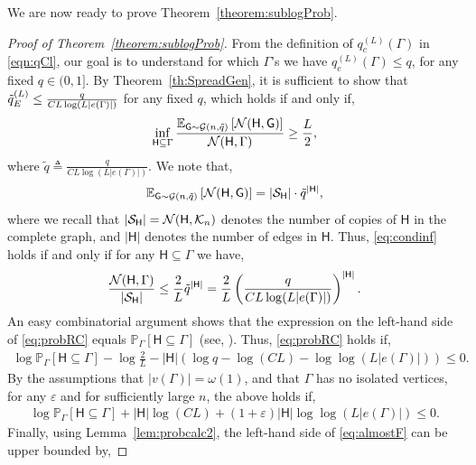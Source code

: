 \documentclass[12pt]{article}
\newcommand{\E}{\mathbb{E}}
\def\P{{\mathbb P}}
\newcommand{\calG}{{\cal G}}
\newcommand{\calK}{{\cal K}}
\newcommand{\calN}{{\cal N}}
\newcommand{\calS}{{\cal S}}
\newcommand{\p}[1]{\left(#1\right)}
\newcommand{\pp}[1]{\left[#1\right]}
\newcommand{\s}[1]{\mathsf{#1}}
\begin{document}
We are now ready to prove Theorem~\ref{theorem:sublogProb}.
\begin{proof}[Proof of Theorem~\ref{theorem:sublogProb}]
    From the definition of $q_{c}^{(L)}(\Gamma)$ in \eqref{eqn:qCl}, our goal is to understand for which $\Gamma$'s we have $q_{c}^{(L)}(\Gamma)\leq q$, for any fixed $q\in (0,1]$. By Theorem~\ref{th:SpreadGen}, it is sufficient to show that $ \Tilde{q}_E^{(L)}\leq \frac{q}{CL\log(L|e(\Gamma)|)}$ for any fixed $q$, which holds if and only if,
    \begin{align}
        \inf_{\s{H}\subseteq \Gamma} \frac{\E_{\s{G}\sim\calG(n,\tilde{q})}\pp{\calN(\s{H},\s{G})}}{\calN(\s{H},\Gamma)}\geq \frac{L}{2},\label{eq:condinf}
    \end{align}
    where $\tilde{q}\triangleq\frac{q}{CL\log(L|e(\Gamma)|)}$. We note that,
    \begin{align}
    {\E_{\s{G}\sim\calG(n,\tilde{q})}\pp{\calN(\s{H},\s{G})}}=|\calS_{\s{H}}|\cdot \tilde{q}^{|\s{H}|},
    \end{align}
    where we recall that $|\calS_{\s{H}}|=\calN(\s{H},\calK_n)$ denotes the number of copies of $\s{H}$ in the complete graph, and $|\s{H}|$ denotes the number of edges in $\s{H}$. Thus, \eqref{eq:condinf} holds if and only if for any $\s{H}\subseteq \Gamma$ we have,
    \begin{align}
        \frac{\calN(\s{H},\Gamma)}{|\calS_{\s{H}}|}\leq \frac{2}{L} \tilde{q}^{|\s{H}|}=\frac{2}{L}\p{\frac{q}{CL\log(L|e(\Gamma)|)}}^{|\s{H}|}.\label{eq:probRC}
    \end{align}
    An easy combinatorial argument shows that the expression on the left-hand side of \eqref{eq:probRC} equals $\P_{\Gamma}[\s{H}\subseteq \Gamma]$ (see, \cite[Lemma~2]{elimelech2025detecting}). Thus, \eqref{eq:probRC} holds if,
    \begin{align}
        \log \P_{\Gamma}[\s{H}\subseteq \Gamma]-\log\frac{2}{L}-|\s{H}|\p{\log q -\log(CL)-\log\log(L|e(\Gamma)|)}\leq 0.
    \end{align}
    By the assumptions that $|v(\Gamma)|=\omega(1)$, and that $\Gamma$ has no isolated vertices, for any $\varepsilon$ and for sufficiently large $n$, the above holds if, 
    \begin{align}
        \log \P_{\Gamma}[\s{H}\subseteq \Gamma]+|\s{H}|\log(CL)+(1+\varepsilon)|\s{H}|\log\log(L|e(\Gamma)|)\leq 0.\label{eq:almostF}
    \end{align}
    Finally, using Lemma~\ref{lem:probcalc2}, the left-hand side of \eqref{eq:almostF} can be upper bounded by,

\end{proof}
\end{document}
